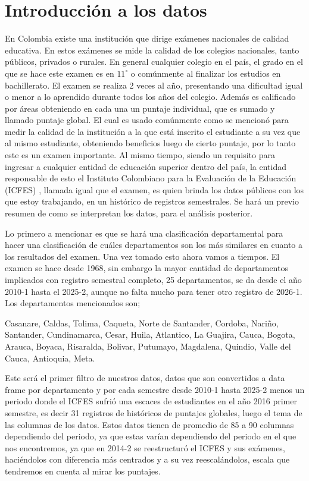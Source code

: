 \documentclass[12pt,a4paper]{article}
\begin{document}
\tableofcontents
\newpage


\section{Introducción a los datos}
    
    En Colombia existe una institución que dirige exámenes nacionales de calidad educativa. En estos exámenes se mide la calidad de los colegios nacionales, tanto públicos, privados o rurales. En general cualquier colegio en el país,
    el grado en el que se hace este examen es en $11^{\circ}$ o comúnmente al finalizar los estudios en bachillerato. El examen se realiza 2 veces al año, presentando una dificultad igual o menor a lo aprendido durante todos los años del colegio. Además es calificado por áreas obteniendo en cada una un puntaje individual, que es sumado y llamado puntaje global.
    El cual es usado comúnmente como se mencionó para medir la calidad de la institución a la que está inscrito el estudiante a su vez que al mismo estudiante, obteniendo beneficios luego de cierto puntaje, por lo tanto este es un examen importante. Al mismo tiempo, siendo un requisito para ingresar a cualquier entidad de educación superior dentro del país, la entidad responsable de esto el Instituto Colombiano para la Evaluación de la Educación (ICFES) \cite{ICFES2026}, llamada igual que el examen,
    es quien brinda los datos públicos con los que estoy trabajando, en un histórico de registros semestrales.
    Se hará un previo resumen de como se interpretan los datos, para el análisis posterior.

    Lo primero a mencionar es que se hará una clasificación departamental para hacer una clasificación de cuáles departamentos son los más similares en cuanto a los resultados del examen. Una vez tomado esto ahora vamos a tiempos. El examen se hace desde 1968, sin embargo la mayor cantidad de departamentos implicados con registro semestral completo, 25 departamentos, se da desde el año 2010-1 hasta el 2025-2, aunque no falta mucho para tener otro registro de 2026-1.
 Los departamentos mencionados son; 

    Casanare, Caldas, Tolima, Caqueta, Norte de Santander, Cordoba, Nariño, Santander, Cundinamarca, Cesar, Huila, Atlantico, La Guajira, Cauca, Bogota, Arauca, Boyaca, Risaralda, Bolivar, Putumayo, Magdalena, Quindio, Valle del Cauca, Antioquia, Meta.
    
    Este será el primer filtro de nuestros datos, datos que son convertidos a data frame por departamento y por cada semestre desde 2010-1 hasta 2025-2 menos un periodo donde el ICFES sufrió una escaces de estudiantes en el año 2016 primer semestre, es decir 31 registros de históricos de puntajes globales, 
    luego el tema de las columnas de los datos. Estos datos tienen de promedio de 85 a 90 columnas dependiendo del periodo, ya que estas varían dependiendo del periodo en el que nos encontremos, ya que en 2014-2 se reestructuró el ICFES y sus exámenes, haciéndolos
    con diferencia más centrados y a su vez reescalándolos, escala que tendremos en cuenta al mirar los puntajes.
\end{document}
